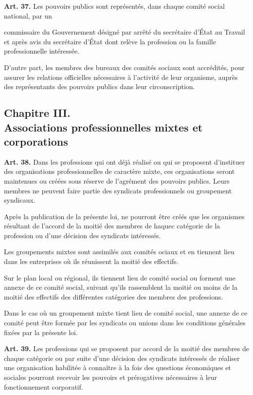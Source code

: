 \documentclass[french,twoside]{book} %
\newcommand{\labelchar}[1]{\textbf{\color{rubric} #1}}
\begin{document}
\noindent \labelchar{Art. 37.} Les pouvoirs publics sont représentés, dans chaque comité social national, par un\par
commissaire du Gouvernement désigné par arrêté du secrétaire d’État au Travail et après avis du secrétaire d’État dont relève la profession ou la famille professionnelle intéressée.\par
D’autre part, les membres des bureaux des comités sociaux sont accrédités, pour assurer les relations officielles nécessaires à l’activité de leur organisme, auprès des représentants des pouvoirs publics dans leur circonscription.
\subsection[{Chapitre III. Associations professionnelles mixtes et corporations}]{Chapitre III. \\
Associations professionnelles mixtes et corporations}
\noindent \labelchar{Art. 38.} Dans les professions qui ont déjà réalisé ou qui se proposent d’instituer des organisations professionnelles de caractère mixte, ces organisations seront maintenues ou créées sous réserve de l’agrément des pouvoirs publics. Leurs membres ne peuvent faire partie des syndicats professionnels ou groupement syndicaux.\par
Après la publication de la présente loi, ne pourront être créés que les organismes résultant de l’accord de la moitié des membres de haquec catégorie de la profession ou d’une décision des syndicats intéressés.\par
Les groupements mixtes sont assimilés aux comités ociaux et en tiennent lieu dans les entreprises où ils réunissent la moitié des effectifs.\par
Sur le plan local ou régional, ils tiennent lieu de comité social ou forment une annexe de ce comité social, suivant qu’ils rassemblent la moitié ou moins de la moitié des effectifs des différentes catégories des membres des professions.\par
Dans le cas où un groupement mixte tient lieu de comité social, une annexe de ce comité peut être formée par les syndicats ou unions dans les conditions générales fixées par la présente loi.\par
\bigbreak
\noindent \labelchar{Art. 39.} Les professions qui se proposent par accord de la moitié des membres de chaque catégorie ou par suite d’une décision des syndicats intéressés de réaliser une organisation habilitée à connaître à la fois des questions économiques et sociales pourront recevoir les pouvoirs et prérogatives nécessaires à leur fonctionnement corporatif.\par
\end{document}
